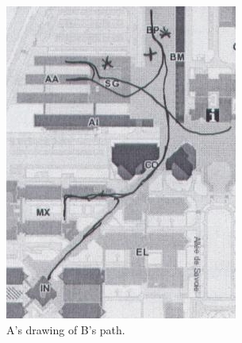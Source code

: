 \documentclass[twocolumn]{article}
\begin{document}
\begin{figure}[h!t]
        \centering
        \begin{subfigure}{.3\textwidth}
            \includegraphics[width=\linewidth]{image6.png}
            \caption{A's drawing of B's path.}
        \end{subfigure}
        \begin{subfigure}{.3\textwidth}

\end{subfigure}
\end{figure}
\end{document}
